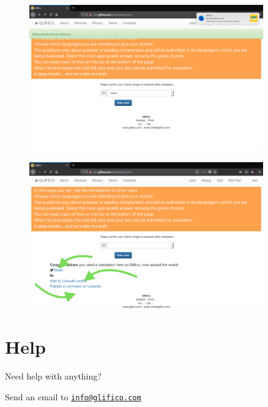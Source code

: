 \documentclass[11 pt, a4paper]{article}
\begin{document}
\clearpage
\begin{figure}[H]
\centering
\includegraphics[width=0.9\textwidth]{translator_socialrating8.png}
\end{figure}


\begin{figure}[H]
\centering
\includegraphics[width=0.9\textwidth]{translator_socialrating9.png}
\end{figure}

\clearpage
\section{Help}
Need help with anything?

Send an email to \href{mailto:info@glifico.com}{\nolinkurl{info@glifico.com}}
\end{document}

